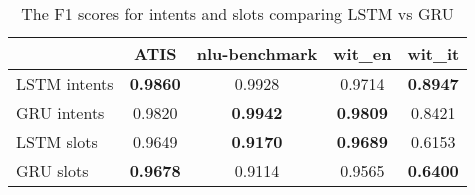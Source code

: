 
\begin{table}
  \begin{tabularx}{\textwidth}{Lcccc}
    \toprule
    & \textbf{ATIS} & \textbf{nlu-benchmark} & \textbf{wit\_en} & \textbf{wit\_it} \\
    \midrule
    LSTM intents & \textbf{0.9860} & 0.9928 & 0.9714 & \textbf{0.8947} \\
    GRU intents & 0.9820 & \textbf{0.9942} & \textbf{0.9809} & 0.8421 \\
    \midrule
    LSTM slots & 0.9649 & \textbf{0.9170} & \textbf{0.9689} & 0.6153 \\
    GRU slots & \textbf{0.9678} & 0.9114 & 0.9565 & \textbf{0.6400} \\
    \bottomrule
  \end{tabularx}
  \caption{The F1 scores for intents and slots comparing LSTM vs GRU}\label{tab:LSTMvsGRU}
\end{table}
